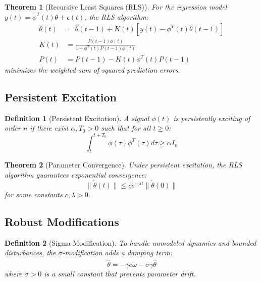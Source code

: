 \documentclass[a4paper, 11pt]{article}
\newtheorem{definition}{Definition}[section]
\newtheorem{theorem}{Theorem}[section]
\begin{document}
\begin{theorem}[Recursive Least Squares (RLS)]
For the regression model $y(t) = \phi^T(t)\theta + \epsilon(t)$, the RLS algorithm:
\begin{align}
\hat{\theta}(t) &= \hat{\theta}(t-1) + K(t)[y(t) - \phi^T(t)\hat{\theta}(t-1)] \\
K(t) &= \frac{P(t-1)\phi(t)}{1 + \phi^T(t)P(t-1)\phi(t)} \\
P(t) &= P(t-1) - K(t)\phi^T(t)P(t-1)
\end{align}
minimizes the weighted sum of squared prediction errors.
\end{theorem}

\subsection{Persistent Excitation}

\begin{definition}[Persistent Excitation]
A signal $\phi(t)$ is persistently exciting of order $n$ if there exist $\alpha, T_0 > 0$
such that for all $t \geq 0$:
\begin{equation}
\int_t^{t+T_0} \phi(\tau)\phi^T(\tau) d\tau \geq \alpha I_n
\end{equation}
\end{definition}

\begin{theorem}[Parameter Convergence]
Under persistent excitation, the RLS algorithm guarantees exponential convergence:
\begin{equation}
\|\tilde{\theta}(t)\| \leq c e^{-\lambda t} \|\tilde{\theta}(0)\|
\end{equation}
for some constants $c, \lambda > 0$.
\end{theorem}

\subsection{Robust Modifications}

\begin{definition}[Sigma Modification]
To handle unmodeled dynamics and bounded disturbances, the $\sigma$-modification adds a
damping term:
\begin{equation}
\dot{\hat{\theta}} = -\gamma e \omega - \sigma \gamma \hat{\theta}
\end{equation}
where $\sigma > 0$ is a small constant that prevents parameter drift.
\end{definition}
\end{document}
